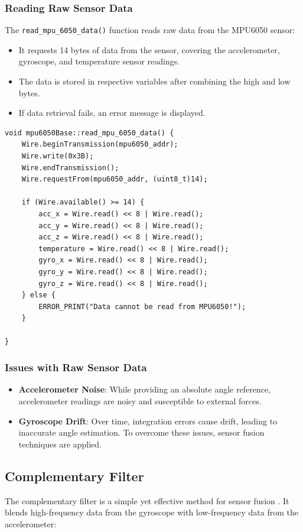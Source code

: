 \subsubsection{Reading Raw Sensor Data}
The \texttt{read\_mpu\_6050\_data()} function reads raw data from the MPU6050 sensor:
\begin{itemize}
	\item It requests 14 bytes of data from the sensor, covering the accelerometer, gyroscope, and temperature sensor readings.
	\item The data is stored in respective variables after combining the high and low bytes. 
	\item If data retrieval fails, an error message is displayed.
\end{itemize}
\begin{lstlisting}[style=cppstyle2]
void mpu6050Base::read_mpu_6050_data() {
	Wire.beginTransmission(mpu6050_addr);
	Wire.write(0x3B);
	Wire.endTransmission();
	Wire.requestFrom(mpu6050_addr, (uint8_t)14);
	
	if (Wire.available() >= 14) {
		acc_x = Wire.read() << 8 | Wire.read();
		acc_y = Wire.read() << 8 | Wire.read();
		acc_z = Wire.read() << 8 | Wire.read();
		temperature = Wire.read() << 8 | Wire.read();
		gyro_x = Wire.read() << 8 | Wire.read();
		gyro_y = Wire.read() << 8 | Wire.read();
		gyro_z = Wire.read() << 8 | Wire.read();
	} else {
		ERROR_PRINT("Data cannot be read from MPU6050!");
	}
	
}
\end{lstlisting}

\subsubsection{Issues with Raw Sensor Data}
\begin{itemize}
\item \textbf{Accelerometer Noise}: While providing an absolute angle reference, accelerometer readings are noisy and susceptible to external forces.
\item \textbf{Gyroscope Drift}: Over time, integration errors cause drift, leading to inaccurate angle estimation.
To overcome these issues, sensor fusion techniques are applied.
\end{itemize}


\subsection{Complementary Filter}
The complementary filter is a simple yet effective method for sensor fusion \cite{rabbany_design_2021} \cite{10193276} \cite{1174486}. It blends high-frequency data from the gyroscope with low-frequency data from the accelerometer:

